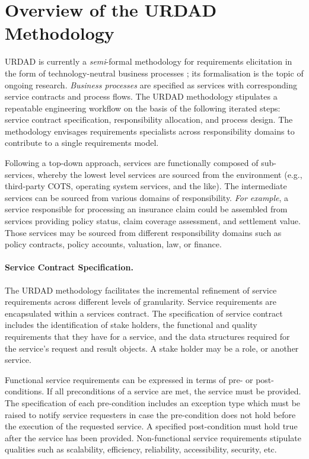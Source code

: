 \section{Overview of the URDAD Methodology 
\label{sec:urdadMethodology}}

URDAD is currently a \emph{semi}-formal methodology for requirements elicitation in the form of technology-neutral business processes \cite{solms_urdad_2010}; its formalisation is the topic of ongoing research. \emph{Business processes} are specified as services with corresponding service contracts and process flows. The URDAD methodology stipulates a repeatable engineering workflow on the basis of the following iterated steps: service contract specification, responsibility allocation, and process design. The methodology envisages requirements specialists across responsibility domains to contribute to a single requirements model.
 
Following a top-down approach, services are functionally composed of sub-services, whereby the lowest level services are sourced from the environment (e.g., third-party COTS, operating system services, and the like). The intermediate services can be sourced from various domains of responsibility. \emph{For example}, a service responsible for processing an insurance claim could be assembled from services providing policy status, claim coverage assessment, and settlement value. Those services may be sourced from different responsibility domains such as policy contracts, policy accounts, valuation, law, or finance.

\paragraph{Service Contract Specification.} The URDAD methodology facilitates the incremental refinement of service requirements across different levels of granularity. Service requirements are encapsulated within a services contract. The specification of service contract includes the identification of stake holders, the functional and quality requirements that they have for a service, and the data structures required for the service's request and result objects. A stake holder may be a role, or another service.

Functional service requirements can be expressed in terms of pre- or post-conditions. If all preconditions of a service are met, the service must be provided. The specification of each pre-condition includes an exception type which must be raised to notify service requesters in case the pre-condition does not hold before the execution of the requested service. A specified post-condition must hold true after the service has been provided. Non-functional service requirements stipulate qualities such as scalability, efficiency, reliability, accessibility, security, etc.

